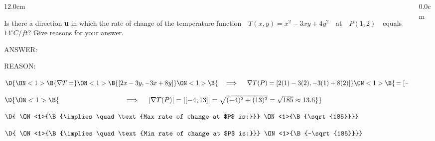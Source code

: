 \begin{frame}
\begin{columns}\begin{column}{12.0cm}

\vspace{0.1cm}

\scriptsize	

\EX Is there a direction {\bf u} in which the rate of change of the temperature function \,\, $T(x,y) = x^2 - 3xy + 4y^2$ \,\, at \,\, $P(1, 2)$ \,\,  equals \,\,  $14^{\circ} C/ft$? Give reasons for your answer.
	
	\vspace{0.2cm}
	
ANSWER: 

\vspace{0.2cm}

REASON: 

\vspace{0.2cm}

$\D{
\ON<1>{\B{\nabla T = }}
\ON<1>{\B{[2x-3y,-3x+8y]}}
\ON<1>{\B{ \quad \implies \quad \nabla T(P) = [2(1)-3(2),-3(1)+8(2)]}}
\ON<1>{\B{\,= [-4,13]}}
}$

\vspace{0.2cm}

$\D{
\ON<1>{\B{ \hspace{2.6cm} \qquad \implies \quad |\nabla T(P)| = |[-4,13]| = \sqrt{(-4)^2 + (13)^2} = \sqrt{185} \approx 13.6}}
}$

\vspace{0.5cm}

$\D{
\ON<1>{\B{\implies \quad \text{Max rate of change at $P$ is:}}}
\ON<1>{\B{\sqrt{185}}}}$

\vspace{0.5cm}

$\D{
\ON<1>{\B{\implies \quad \text{Min rate of change at $P$ is:}}}
\ON<1>{\B{-\sqrt{185}}}}$

\vspace{0.5cm}



\vspace{4.2cm}

\end{column}\begin{column}{0.0cm}\end{column}\end{columns}
\end{frame}


